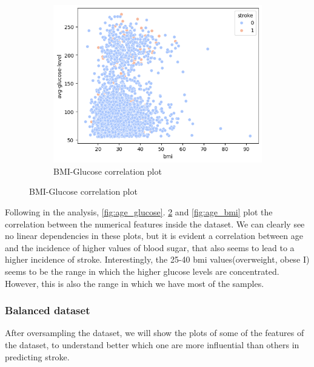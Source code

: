 \documentclass[twocolumn, 9pt]{extarticle}
\begin{document}
\begin{figure}[ht]
\begin{subfigure}[b]{\linewidth}
\centering
\includegraphics[scale=0.4]{images/bmi-glucose_plot.png}
\caption{BMI-Glucose correlation plot}
\label{fig:bmi_glucose}
\end{subfigure}
\end{figure}

Following in the analysis, \ref{fig:age_glucose}. \ref{fig:bmi_glucose} and \ref{fig:age_bmi} plot the correlation between the numerical features inside the dataset. We can clearly see no linear dependencies in these plots, but it is evident a correlation between age and the incidence of higher values of blood sugar, that also seems to lead to a higher incidence of stroke. Interestingly, the 25-40 bmi values(overweight, obese I) seems to be the range in which the higher glucose levels are concentrated. However, this is also the range in which we have most of the samples.

\subsubsection{Balanced dataset}
After oversampling the dataset, we will show the plots of some of the features of the dataset, to understand better which one are more influential than others in predicting stroke.
\end{document}

